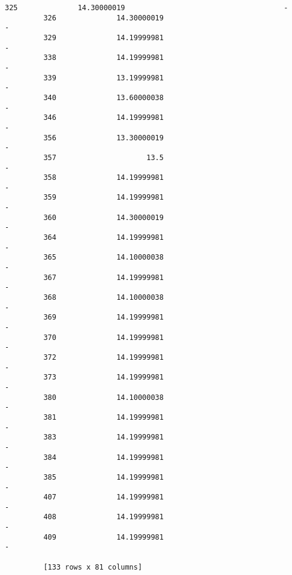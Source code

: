 \documentclass[11pt]{article}
\begin{document}
\begin{Verbatim}[commandchars=\\\{\}]
         325              14.30000019                                     -  
         326              14.30000019                                     -  
         329              14.19999981                                     -  
         338              14.19999981                                     -  
         339              13.19999981                                     -  
         340              13.60000038                                     -  
         346              14.19999981                                     -  
         356              13.30000019                                     -  
         357                     13.5                                     -  
         358              14.19999981                                     -  
         359              14.19999981                                     -  
         360              14.30000019                                     -  
         364              14.19999981                                     -  
         365              14.10000038                                     -  
         367              14.19999981                                     -  
         368              14.10000038                                     -  
         369              14.19999981                                     -  
         370              14.19999981                                     -  
         372              14.19999981                                     -  
         373              14.19999981                                     -  
         380              14.10000038                                     -  
         381              14.19999981                                     -  
         383              14.19999981                                     -  
         384              14.19999981                                     -  
         385              14.19999981                                     -  
         407              14.19999981                                     -  
         408              14.19999981                                     -  
         409              14.19999981                                     -  
         
         [133 rows x 81 columns]
\end{Verbatim}
            
\end{document}
